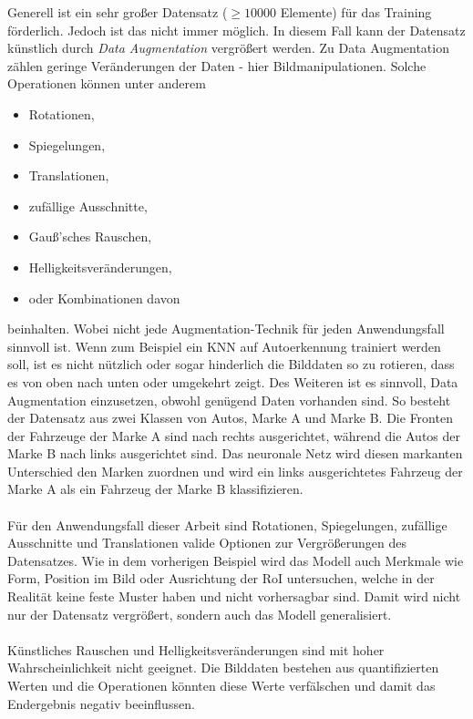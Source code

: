 Generell ist ein sehr großer Datensatz ($\ge10000$ Elemente) für das Training förderlich. Jedoch ist das nicht immer möglich. In diesem Fall kann der Datensatz künstlich durch \textit{Data Augmentation} vergrößert werden. Zu Data Augmentation zählen geringe Veränderungen der Daten - hier Bildmanipulationen. Solche Operationen können unter anderem
\begin{itemize}
	\item Rotationen,
	\item Spiegelungen,
	\item Translationen,
	\item zufällige Ausschnitte,
	\item Gauß'sches Rauschen,
	\item Helligkeitsveränderungen,
	\item oder Kombinationen davon
\end{itemize}
beinhalten. Wobei nicht jede Augmentation-Technik für jeden Anwendungsfall sinnvoll ist. Wenn zum Beispiel ein KNN auf Autoerkennung trainiert werden soll, ist es nicht nützlich oder sogar hinderlich die Bilddaten so zu rotieren, dass es von oben nach unten oder umgekehrt zeigt. Des Weiteren ist es sinnvoll, Data Augmentation einzusetzen, obwohl genügend Daten vorhanden sind. So besteht der Datensatz aus zwei Klassen von Autos, Marke A und Marke B. Die Fronten der Fahrzeuge der Marke A sind nach rechts ausgerichtet, während die Autos der Marke B nach links ausgerichtet sind. Das neuronale Netz wird diesen markanten Unterschied den Marken zuordnen und wird ein links ausgerichtetes Fahrzeug der Marke A als ein Fahrzeug der Marke B klassifizieren.\cite{ref:augmentation}
\\\\
Für den Anwendungsfall dieser Arbeit sind Rotationen, Spiegelungen, zufällige Ausschnitte und Translationen valide Optionen zur Vergrößerungen des Datensatzes. Wie in dem vorherigen Beispiel wird das Modell auch Merkmale wie Form, Position im Bild oder Ausrichtung der RoI untersuchen, welche in der Realität keine feste Muster haben und nicht vorhersagbar sind. Damit wird nicht nur der Datensatz vergrößert, sondern auch das Modell generalisiert.
\\\\
Künstliches Rauschen und Helligkeitsveränderungen sind mit hoher Wahrscheinlichkeit nicht geeignet. Die Bilddaten bestehen aus quantifizierten Werten und die Operationen könnten diese Werte verfälschen und damit das Endergebnis negativ beeinflussen.

